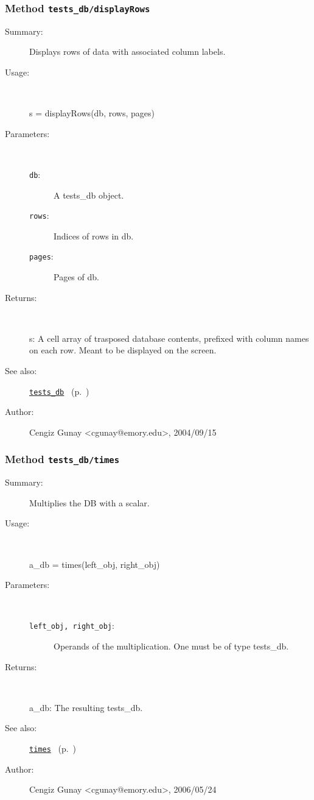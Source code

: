 \subsubsection[Method \texttt{displayRows}]{Method \texttt{tests\_db/displayRows}}%
%
\label{ref_tests_db__displayRows}%
\hypertarget{ref_tests_db__displayRows}{}%
\begin{description}
\item[Summary:]Displays rows of data with associated column labels.
%
\item[Usage:]~%
\begin{lyxcode}%
s = displayRows(db, rows, pages)
%
\end{lyxcode}%
%
%
\item[Parameters:]~
\begin{description}%
\item[\texttt{db}:]
 A tests\_db object.
\item[\texttt{rows}:]
 Indices of rows in db.
\item[\texttt{pages}:]
 Pages of db.
\end{description}%
%
\item[Returns:]~

	s: A cell array of trasposed database contents, prefixed with 
	   column names on each row. Meant to be displayed on the screen.
%
%
\item[See also:]%
\hyperlink{ref_tests_db}{\texttt{tests\_db}}%
\ (p.~\pageref{ref_tests_db})%
%
%
\item[Author:]%
Cengiz Gunay <cgunay@emory.edu>, 2004/09/15%
\end{description}
\methodline%
\subsubsection[Method \texttt{times}]{Method \texttt{tests\_db/times}}%
%
\label{ref_tests_db__times}%
\hypertarget{ref_tests_db__times}{}%
\begin{description}
\item[Summary:]Multiplies the DB with a scalar.
%
\item[Usage:]~%
\begin{lyxcode}%
a\_db = times(left\_obj, right\_obj)
%
\end{lyxcode}%
%
%
\item[Parameters:]~
\begin{description}%
\item[\texttt{left\_obj, right\_obj}:]
 Operands of the multiplication. One must be of type tests\_db.
\end{description}%
%
\item[Returns:]~

	a\_db: The resulting tests\_db.
%
%
\item[See also:]%
\hyperlink{ref_times}{\texttt{times}}%
\ (p.~\pageref{ref_times})%
%
%
\item[Author:]%
Cengiz Gunay <cgunay@emory.edu>, 2006/05/24%
\end{description}
\methodline%
